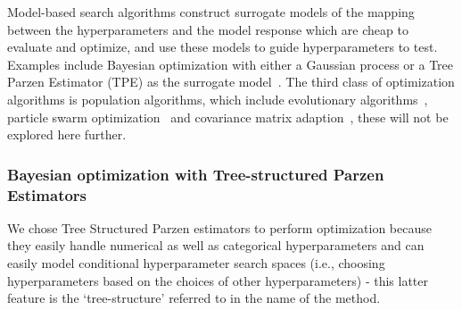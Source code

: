 \documentclass[journal=jacsat,manuscript=article]{achemso}
\begin{document}
Model-based search algorithms construct surrogate models of the mapping between the hyperparameters and the model response which are cheap to evaluate and optimize, and use these models to guide hyperparameters to test. Examples include Bayesian optimization with either a Gaussian process or a  Tree Parzen Estimator (TPE) as the surrogate model~\cite{bergstraAlgorithmsHyperParameterOptimizationa}.  The third class of optimization algorithms is population algorithms, which include evolutionary algorithms~\cite{simon2013evolutionary,eberhart1998comparison}, particle swarm optimization~\cite{kennedyParticleSwarmOptimization1995,eberhart1998comparison} and covariance matrix adaption~\cite{hansenCMAEvolutionStrategy2016}, these will not be explored here further. 

\subsubsection{Bayesian optimization with Tree-structured Parzen Estimators}
We chose Tree Structured Parzen estimators to perform optimization because they easily handle numerical as well as categorical hyperparameters and can easily model conditional hyperparameter search spaces (i.e., choosing hyperparameters based on the choices of other hyperparameters) - this latter feature is the `tree-structure' referred to in the name of the method. 
\end{document}

